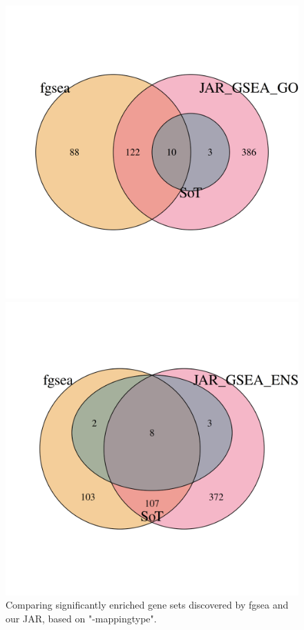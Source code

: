 \documentclass[12pt]{article}
\begin{document}
\begin{figure}[H]
    \centering
    \begin{minipage}{0.49\textwidth}
        \centering
        \includegraphics[width=\textwidth]{./plots/go_mappingCompfgsea.png}
    \end{minipage}
    \hfill
    \begin{minipage}{0.49\textwidth}
        \centering
        \includegraphics[width=\textwidth]{./plots/ens_mappingCompgfgsea.png}
    \end{minipage}
    \caption{Comparing significantly enriched gene sets discovered by fgsea and our JAR, based on "-mappingtype".}
    \label{fig:go-mapping-fgsea}
\end{figure}
\end{document}

